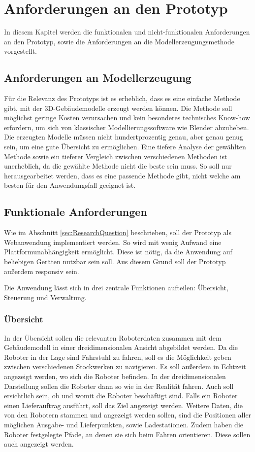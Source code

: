 \newpage
\section{Anforderungen an den Prototyp}\label{sec:Requirements}
In diesem Kapitel werden die funktionalen und nicht-funktionalen Anforderungen an den Prototyp, sowie die Anforderungen an die Modellerzeugungsmethode vorgestellt.

\subsection{Anforderungen an Modellerzeugung}

Für die Relevanz des Prototyps ist es erheblich, dass es eine einfache Methode gibt, mit der 3D-Gebäudemodelle erzeugt werden können. Die Methode soll möglichst geringe Kosten verursachen und kein besonderes technisches Know-how erfordern, um sich von klassischer Modellierungssoftware wie Blender abzuheben. Die erzeugten Modelle müssen nicht hundertprozentig genau, aber genau genug sein, um eine gute Übersicht zu ermöglichen. Eine tiefere Analyse der gewählten Methode sowie ein tieferer Vergleich zwischen verschiedenen Methoden ist unerheblich, da die gewählte Methode nicht die beste sein muss. So soll nur herausgearbeitet werden, dass es eine passende Methode gibt, nicht welche am besten für den Anwendungsfall geeignet ist.

\subsection{Funktionale Anforderungen}\label{sec:FunctionalRequirements}
Wie im Abschnitt \ref{sec:ResearchQuestion} beschrieben, soll der Prototyp als Webanwendung implementiert werden. So wird mit wenig Aufwand eine Plattformunabhängigkeit ermöglicht. Diese ist nötig, da die Anwendung auf beliebigen Geräten nutzbar sein soll. Aus diesem Grund soll der Prototyp außerdem responsiv sein.

Die Anwendung lässt sich in drei zentrale Funktionen aufteilen: Übersicht, Steuerung und Verwaltung.

\subsubsection{Übersicht}

In der Übersicht sollen die relevanten Roboterdaten zusammen mit dem Gebäudemodell in einer dreidimensionalen Ansicht abgebildet werden. Da die Roboter in der Lage sind Fahrstuhl zu fahren, soll es die Möglichkeit geben zwischen verschiedenen Stockwerken zu navigieren. Es soll außerdem in Echtzeit angezeigt werden, wo sich die Roboter befinden. In der dreidimensionalen Darstellung sollen die Roboter dann so wie in der Realität fahren. Auch soll ersichtlich sein, ob und womit die Roboter beschäftigt sind. Falls ein Roboter einen Lieferauftrag ausführt, soll das Ziel angezeigt werden. Weitere Daten, die von den Robotern stammen und angezeigt werden sollen, sind die Positionen aller möglichen Ausgabe- und Lieferpunkten, sowie Ladestationen. Zudem haben die Roboter festgelegte Pfade, an denen sie sich beim Fahren orientieren. Diese sollen auch angezeigt werden.

